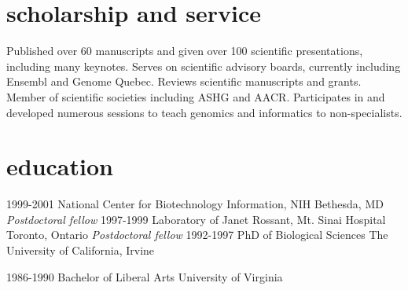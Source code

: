 \documentclass[]{dmc-cv} %
\begin{document}

\section{scholarship and service}
Published over 60 manuscripts and given over 100 scientific presentations, including many keynotes. Serves on scientific advisory boards, currently including Ensembl and Genome Quebec. Reviews scientific manuscripts and grants. Member of scientific societies including ASHG and AACR. Participates in and developed numerous sessions to teach genomics and informatics to non-specialists.


\section{education}

\begin{entrylist}
\entry
{1999-2001}
{National Center for Biotechnology Information, NIH}
{Bethesda, MD}
{\emph{Postdoctoral fellow}
}
\entry
{1997-1999}
{Laboratory of Janet Rossant, Mt. Sinai Hospital}
{Toronto, Ontario}
{\emph{Postdoctoral fellow}
}
\entry
{1992-1997}
{PhD {\normalfont of Biological Sciences}}
{The University of California, Irvine}

\entry
{1986-1990}
{Bachelor {\normalfont of Liberal Arts}}
{University of Virginia}

\end{entrylist}

\end{document}
